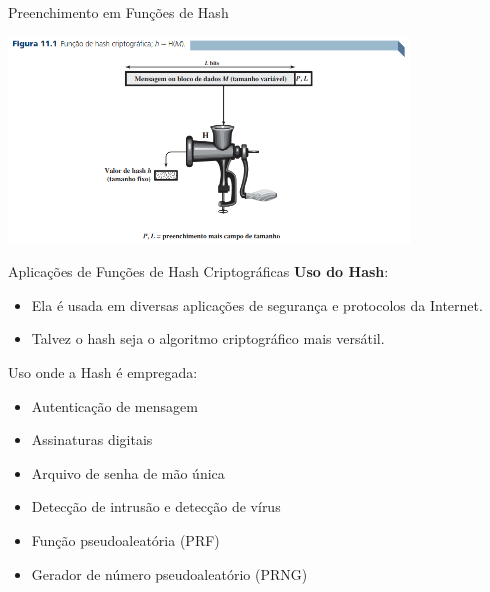 \begin{frame}{Preenchimento em Funções de Hash}

    \begin{center}
        \includegraphics[width=0.8\textwidth]{Figuras/Hash-moedor.png}
    \end{center}
\end{frame}



\begin{frame}{Aplicações de Funções de Hash Criptográficas}
\textbf{Uso do Hash}:

\begin{itemize}
        \item Ela é usada em diversas aplicações de segurança e protocolos da Internet. 
    \item Talvez o hash seja o algoritmo criptográfico mais versátil.  
 
\end{itemize}

\medskip
Uso onde a Hash é empregada:

\begin{itemize}
  \item Autenticação de mensagem
  \item Assinaturas digitais
  \item Arquivo de senha de mão única
  \item Detecção de intrusão e detecção de vírus
  \item Função pseudoaleatória (PRF) 
  \item Gerador de número pseudoaleatório (PRNG)
\end{itemize}
\end{frame}


